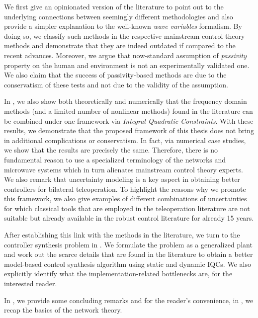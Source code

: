 We first give an opinionated version of the literature to point out to the underlying connections between seemingly different methodologies and also provide a simpler explanation to the well-known \emph{wave variables} formalism. By doing so, we classify such methods in the respective mainstream control theory methods and demonstrate that they are indeed outdated if compared to the recent advances. Moreover, we argue that now-standard assumption of \emph{passivity} property on the human and environment is not an experimentally validated one. We also claim that the success of passivity-based methods are due to the conservatism of these tests and not due to the validity of the assumption.

In , we also show both theoretically and numerically that the frequency domain methods (and a limited number of nonlinear methods) found in the literature can be combined under one framework via \emph{Integral Quadratic Constraints}. With these results, we demonstrate that the proposed framework of this thesis does not bring in additional complications or conservatism. In fact, via numerical case studies, we show that the results are precisely the same. Therefore, there is no fundamental reason to use a specialized terminology of the networks and microwave systems which in turn alienates mainstream control theory experts. We also remark that uncertainty modeling is a key aspect in obtaining better controllers for bilateral teleoperation. To highlight the reasons why we promote this framework, we also give examples of different combinations of uncertainties for which classical tools that are employed in the teleoperation literature are not suitable but already available in the robust control literature for already 15 years. 


After establishing this link with the methods in the literature, we turn to the controller synthesis problem in . We formulate the problem as a generalized plant and work out the scarce details that are found in the literature to obtain a better model-based control synthesis algorithm using static and dynamic IQCs. We also explicitly identify what the implementation-related bottlenecks are, for the interested reader.  

In , we provide some concluding remarks and for the reader's convenience, in , we recap the basics of the network theory.

